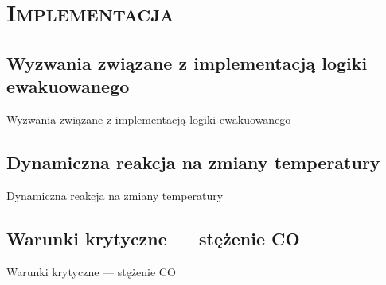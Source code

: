 \section{\scshape Implementacja}

\subsection{Wyzwania związane z implementacją logiki ewakuowanego}
\begin{frame}{Wyzwania związane z implementacją logiki ewakuowanego}
\end{frame}

\subsection{Dynamiczna reakcja na zmiany temperatury}
\begin{frame}{Dynamiczna reakcja na zmiany temperatury}
\end{frame}

\subsection{Warunki krytyczne --- stężenie CO}
\begin{frame}{Warunki krytyczne --- stężenie CO}
\end{frame}